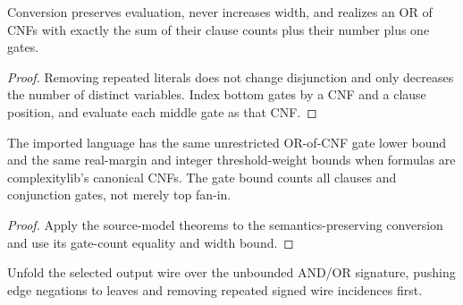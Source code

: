 \begin{theorem}
  \label{thm:circuits-openai-canonical-cnf}
  \leanok
  Conversion preserves evaluation, never increases width, and realizes an OR
  of CNFs with exactly the sum of their clause counts plus their number plus one gates.
\end{theorem}
\begin{proof}
  \leanok
  Removing repeated literals does not change disjunction and only decreases
  the number of distinct variables. Index bottom gates by a CNF and a clause
  position, and evaluate each middle gate as that CNF.
\end{proof}

\begin{corollary}
  \label{cor:circuits-openai-canonical-cnf-bounds}
  \leanok
  The imported language has the same unrestricted OR-of-CNF gate lower bound
  and the same real-margin and integer threshold-weight bounds when formulas
  are complexitylib's canonical CNFs. The gate bound counts all clauses and
  conjunction gates, not merely top fan-in.
\end{corollary}
\begin{proof}
  \leanok
  Apply the source-model theorems to the semantics-preserving conversion and
  use its gate-count equality and width bound.
\end{proof}


\begin{definition}
  \label{def:circuits-openai-cslib-normalize}
  \leanok
  Unfold the selected output wire over the unbounded AND/OR signature, pushing
  edge negations to leaves and removing repeated signed wire incidences first.
\end{definition}

